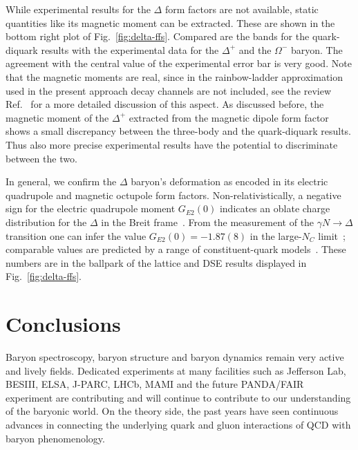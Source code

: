 \documentclass[epj,twocolumn]{webofc}
\begin{document}
While experimental results for the $\Delta$ form factors are not available, static quantities like its magnetic moment can be extracted.
These are shown in the bottom right plot of Fig.~\ref{fig:delta-ffs}. Compared are the bands for the quark-diquark results with the
experimental data for the $\Delta^+$ and the $\Omega^-$ baryon. The agreement with the central value of the experimental error bar
is very good. Note that the magnetic moments are real, since in the rainbow-ladder approximation used in the present approach decay channels
are not included, see the review Ref.~\cite{Eichmann:2016yit} for a more detailed discussion of this aspect. As discussed before, the magnetic 
moment of the $\Delta^+$ extracted from the magnetic dipole form factor shows a small discrepancy between the three-body and the 
quark-diquark results. Thus also more precise experimental results have the potential to discriminate between the two.

In general, we confirm the $\Delta$ baryon's deformation as encoded in its electric quadrupole and magnetic
octupole form factors. Non-relativistically, a negative sign for the electric quadrupole moment $G_{E2}(0)$
indicates an oblate charge distribution for the $\Delta$ in the Breit frame~\cite{Alexandrou:2009hs}.
From the measurement of the $\gamma N\to\Delta$ transition one can infer the value $G_{E2}(0)=-1.87(8)$ in the large-$N_C$ limit~\cite{Buchmann:2002mm,Alexandrou:2009hs}; comparable values are predicted by a range of
constituent-quark models~\cite{Ramalho:2009vc}. These numbers are in the ballpark of the lattice and DSE results
displayed in Fig.~\ref{fig:delta-ffs}.

\section{Conclusions}\label{sec-5}
%
Baryon spectroscopy, baryon structure and baryon dynamics remain very active
and lively fields. Dedicated experiments at many facilities such as Jefferson Lab,
BESIII, ELSA, J-PARC, LHCb, MAMI and the future PANDA/FAIR experiment are contributing
and will continue to contribute to our understanding of the baryonic world.
On the theory side, the past years have seen continuous advances in connecting the
underlying quark and gluon interactions of QCD with baryon phenomenology.
\end{document}
